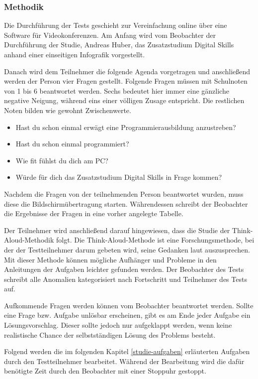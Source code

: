 \subsubsection{Methodik}
Die Durchführung der Tests geschieht zur Vereinfachung online über eine Software
für Videokonferenzen. Am Anfang wird vom Beobachter der Durchführung der
Studie, Andreas Huber, das Zusatzstudium Digital Skills anhand einer
einseitigen Infografik vorgestellt.

Danach wird dem Teilnehmer die folgende Agenda vorgetragen und anschließend
werden der Person vier Fragen gestellt. Folgende Fragen müssen mit Schulnoten
von 1 bis 6 beantwortet werden. Sechs bedeutet hier immer eine gänzliche
negative Neigung, während eins einer völligen Zusage entspricht. Die restlichen
Noten bilden wie gewohnt Zwischenwerte.
\begin{itemize}
    \item Hast du schon einmal erwägt eine Programmierausbildung anzustreben?
    \item Hast du schon einmal programmiert?
    \item Wie fit fühlst du dich am PC?
    \item Würde für dich das Zusatzstudium Digital Skills in Frage kommen?
\end{itemize}

Nachdem die Fragen von der teilnehmenden Person beantwortet wurden, muss diese
die Bildschirmübertragung starten. Währendessen schreibt der Beobachter die
Ergebnisse der Fragen in eine vorher angelegte Tabelle.

Der Teilnehmer wird anschließend darauf hingewiesen, dass die Studie der
Think-Aloud-Methodik folgt. Die Think-Aloud-Methode ist eine Forschungsmethode,
bei der der Testteilnehmer darum gebeten wird, seine Gedanken laut
auszusprechen. Mit dieser Methode können mögliche Aufhänger und Probleme in den
Anleitungen der Aufgaben leichter gefunden werden. Der Beobachter des Tests
schreibt alle Anomalien kategorisiert nach Fortschritt und Teilnehmer des Tests
auf.

Aufkommende Fragen werden können vom Beobachter beantwortet werden. Sollte eine
Frage bzw. Aufgabe unlösbar erscheinen, gibt es am Ende jeder Aufgabe ein
Lösungsvorschlag. Dieser sollte jedoch nur aufgeklappt werden, wenn keine
realistische Chance der selbstständigen Lösung des Problems besteht.

Folgend werden die im folgenden Kapitel \ref{studie-aufgaben} erläuterten
Aufgaben durch den Testteilnehmer bearbeitet. Während der Bearbeitung wird
die dafür benötigte Zeit durch den Beobachter mit einer Stoppuhr gestoppt.

